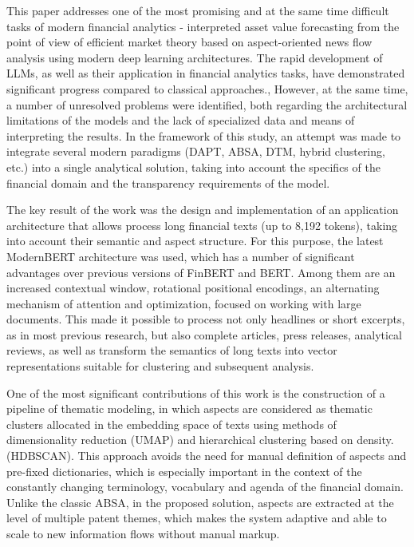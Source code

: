 This paper addresses one of the most promising and at the same time difficult tasks of modern
financial analytics - interpreted asset value forecasting from the point of view
of efficient market theory based on aspect-oriented news flow analysis using
modern deep learning architectures. The rapid development of LLMs, as well as their application in
financial analytics tasks, have demonstrated significant progress compared to classical approaches.,
However, at the same time, a number of unresolved problems were identified, both regarding the architectural limitations
of the models and the lack of specialized data and means of interpreting the results. In the framework
of this study, an attempt was made to integrate several modern paradigms (DAPT,
ABSA, DTM, hybrid clustering, etc.) into a single analytical solution, taking into account the specifics of the financial
domain and the transparency requirements of the model.

The key result of the work was the design and implementation of an application architecture that allows
process long financial texts (up to 8,192 tokens), taking into account their semantic and aspect structure.
For this purpose, the latest ModernBERT architecture was used, which has a number of significant advantages
over previous versions of FinBERT and BERT. Among them are an increased contextual window, rotational
positional encodings, an alternating mechanism of attention and optimization, focused on working with large
documents. This made it possible to process not only headlines or short excerpts, as in most
previous research, but also complete articles, press releases, analytical reviews, as well as transform
the semantics of long texts into vector representations suitable for clustering and subsequent analysis.

One of the most significant contributions of this work is the construction of a pipeline of thematic modeling,
in which aspects are considered as thematic clusters allocated in the embedding space of texts
using methods of dimensionality reduction (UMAP) and hierarchical clustering based on density.
(HDBSCAN). This approach avoids the need for manual definition of aspects and pre-fixed
dictionaries, which is especially important in the context of the constantly changing terminology, vocabulary and agenda of the financial
domain. Unlike the classic ABSA, in the proposed solution, aspects are extracted at the level
of multiple patent themes, which makes the system adaptive and able to scale to new information flows
without manual markup.

